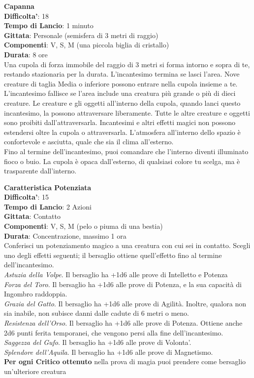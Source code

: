 \begin{multicols}{2}
\medskip\textbf{Capanna}\\
\textbf{Difficolta'}: 18\\
\textbf{Tempo di Lancio}: 1 minuto\\
\textbf{Gittata}: Personale (semisfera di 3 metri di raggio)\\
\textbf{Componenti}: V, S, M (una piccola biglia di cristallo)\\
\textbf{Durata}: 8 ore\\
Una cupola di forza immobile del raggio di 3 metri si forma intorno e sopra di te, restando stazionaria per la durata. L’incantesimo termina se lasci l’area. Nove creature di taglia Media o inferiore possono entrare nella cupola insieme a te. L’incantesimo fallisce se l’area include una creatura più grande o più di dieci creature. Le creature e gli oggetti all’interno della cupola, quando lanci questo incantesimo, la possono attraversare liberamente. Tutte le altre creature e oggetti sono proibiti dall’attraversarla. Incantesimi e altri effetti magici non possono estendersi oltre la cupola o attraversarla. L’atmosfera all’interno dello spazio è confortevole e asciutta, quale che sia il clima all’esterno.\\
Fino al termine dell’incantesimo, puoi comandare che l’interno diventi illuminato fioco o buio. La cupola è opaca dall’esterno, di qualsiasi colore tu scelga, ma è trasparente dall’interno. 


\medskip\textbf{Caratteristica Potenziata}\\
\textbf{Difficolta'}: 15\\
\textbf{Tempo di Lancio}: 2 Azioni\\
\textbf{Gittata}: Contatto\\
\textbf{Componenti}: V, S, M (pelo o piuma di una bestia)\\
\textbf{Durata}: Concentrazione, massimo 1 ora\\
Conferisci un potenziamento magico a una creatura con cui sei in contatto. Scegli uno degli effetti seguenti; il bersaglio ottiene quell’effetto fino al termine dell’incantesimo.\\
\textit{Astuzia della Volpe}. Il bersaglio ha +1d6 alle prove di Intelletto e Potenza\\
\textit{Forza del Toro}. Il bersaglio ha +1d6 alle prove di Potenza, e la sua capacità di Ingombro raddoppia.\\
\textit{Grazia del Gatto}. Il bersaglio ha +1d6 alle prove di Agilità. Inoltre, qualora non sia inabile, non subisce danni dalle cadute di 6 metri o meno.\\
\textit{Resistenza dell’Orso}. Il bersaglio ha +1d6 alle prove di Potenza. Ottiene anche 2d6 punti ferita temporanei, che vengono persi alla fine dell’incantesimo.\\
\textit{Saggezza del Gufo}. Il bersaglio ha +1d6 alle prove di Volonta'. \\
\textit{Splendore dell’Aquila}. Il bersaglio ha +1d6 alle prove di Magnetismo.\\
\textbf{Per ogni Critico ottenuto} nella prova di magia puoi prendere come bersaglio un’ulteriore creatura


\end{multicols}
